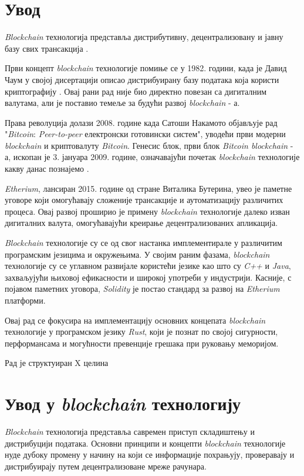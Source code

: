 \documentclass[12pt, a4paper]{article}
\begin{document}


\renewcommand{\contentsname}{Садржај}
\tableofcontents
\pagebreak

\section{Увод}
\textit{Blockchain} технологија представља дистрибутивну, децентрализовану и јавну базу свих трансакција \cite{1}.


Први концепт \textit{blockchain} технологије помиње се у 1982. години, када је Давид Чаум у својој дисертацији описао дистрибуирану базу података која користи криптографију \cite{2}. Овај рани рад није био директно повезан са дигиталним валутама, али је поставио темеље за будући развој \textit{blockchain} - а.

Права револуција долази 2008. године када Сатоши Накамото објављује рад "\textit{Bitcoin}: \textit{Peer-to-peer} електронски готовински систем", уводећи први модерни \textit{blockchain} и криптовалуту \textit{Bitcoin}. Генесис блок, први блок \textit{Bitcoin blockchain} - а, ископан је 3. јануара 2009. године, означавајући почетак \textit{blockchain} технологије какву данас познајемо \cite{3}.

\textit{Etherium}, лансиран 2015. године од стране Виталика Бутерина, увео је паметне уговоре који омогућавају сложеније трансакције и аутоматизацију различитих процеса. Овај развој проширио је примену \textit{blockchain} технологије далеко изван дигиталних валута, омогућавајући креирање децентрализованих апликација.

\textit{Blockchain} технологије су се од свог настанка имплементирале у различитим програмским језицима и окружењима. У својим раним фазама, \textit{blockchain} технологије су се углавном развијале користећи језике као што су \textit{C++} и \textit{Java}, захваљујући њиховој ефикасности и широкој употреби у индустрији. Касније, с појавом паметних уговора, \textit{Solidity} је постао стандард за развој на \textit{Etherium} платформи.

Овај рад се фокусира на имплементацију основних концепата \textit{blockchain} технологије у програмском језику \textit{Rust}, који је познат по својој сигурности, перформансама и могућности превенције грешака при руковању меморијом.

Рад је структуиран X целина
\pagebreak

\section{Увод у \textit{blockchain} технологију}
\textit{Blockchain} технологија представља савремен приступ складиштењу и дистрибуцији података. Основни принципи и концепти \textit{blockchain} технологије нуде дубоку промену у начину на који се информације похрањују, проверавају и дистрибуирају путем децентрализоване мреже рачунара.
\end{document}
